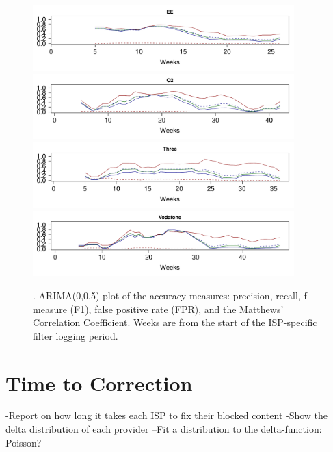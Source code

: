 \documentclass{bmcart}
\begin{document}
\begin{figure}[h!]
\caption{. ARIMA(0,0,5) plot of the accuracy measures: precision, recall, f-measure (F1), false positive rate (FPR), and the Matthews' Correlation Coefficient. Weeks are from the start of the ISP-specific filter logging period.}
\includegraphics[width=0.9\textwidth]{imgs/EE-ts-accuracy}
\includegraphics[width=0.9\textwidth]{imgs/O2-ts-accuracy}
\includegraphics[width=0.9\textwidth]{imgs/Three-ts-accuracy}
\includegraphics[width=0.9\textwidth]{imgs/Vodafone-ts-accuracy}
\label{fig:mobile-accuracy-ts}
\end{figure}
\clearpage






\section*{Time to Correction}
-Report on how long it takes each ISP to fix their blocked content
-Show the delta distribution of each provider
--Fit a distribution to the delta-function: Poisson?
\end{document}
